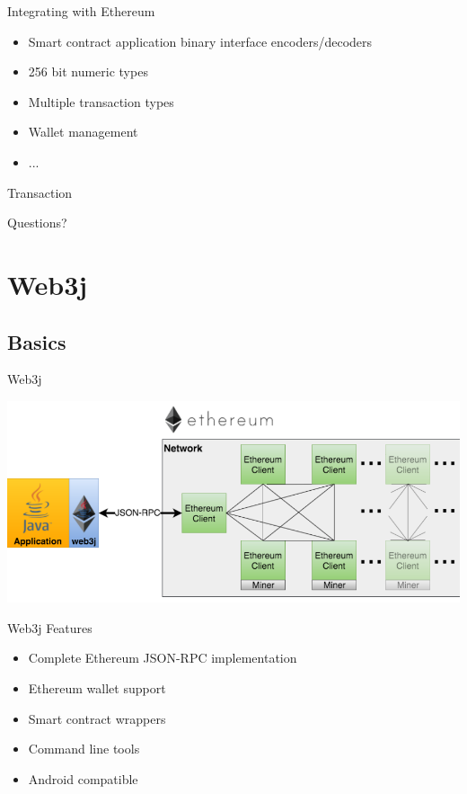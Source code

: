 \documentclass{beamer}
\begin{document}
\begin{frame}{Integrating with Ethereum}
	\begin{itemize}
		\item {
			Smart contract application binary interface
			encoders/decoders
		}
		\item {
			256 bit numeric types
		}
		\item {
			Multiple transaction types
		}
		\item {
			Wallet management
		}
		\item {
			...
		}
	\end{itemize}
\end{frame}

\begin{frame}{Transaction}
	\begin{center}
		Questions?
	\end{center}
\end{frame}

\section{Web3j}

\subsection{Basics}

\begin{frame}{Web3j}
	\begin{center}
		\includegraphics[width=1\linewidth]{web3j-integration}
	\end{center}
\end{frame}

\begin{frame}{Web3j Features}
	\begin{itemize}
		\item {
			Complete Ethereum JSON-RPC implementation
		}
		\item {
			Ethereum wallet support
		}
		\item {
			Smart contract wrappers
		}
		\item {
			Command line tools
		}
		\item {
			Android compatible
		}
	\end{itemize}
\end{frame}
\end{document}
